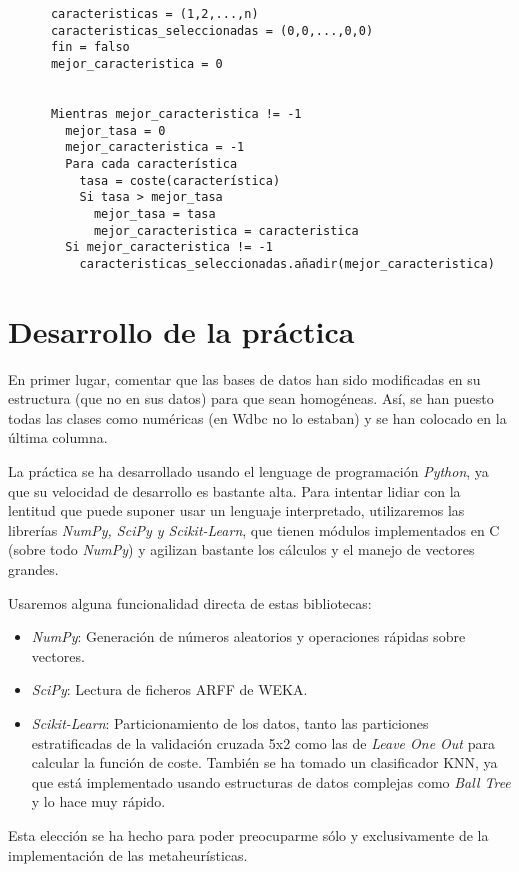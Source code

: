 \documentclass[a4paper, 11pt]{article}
\begin{document}
    \begin{verbatim}
      caracteristicas = (1,2,...,n)
      caracteristicas_seleccionadas = (0,0,...,0,0)
      fin = falso
      mejor_caracteristica = 0


      Mientras mejor_caracteristica != -1
        mejor_tasa = 0
        mejor_caracteristica = -1
        Para cada característica
          tasa = coste(característica)
          Si tasa > mejor_tasa
            mejor_tasa = tasa
            mejor_caracteristica = caracteristica
        Si mejor_caracteristica != -1
          caracteristicas_seleccionadas.añadir(mejor_caracteristica)
    \end{verbatim}
  \section{Desarrollo de la práctica}
    En primer lugar, comentar que las bases de datos han sido modificadas en su estructura (que no en sus datos) para que sean homogéneas. Así, se han puesto todas las clases como numéricas (en Wdbc no lo estaban) y se han colocado en la última columna.

    La práctica se ha desarrollado usando el lenguage de programación \emph{Python}, ya que su velocidad de desarrollo es bastante alta. Para intentar lidiar con la lentitud que puede suponer usar un lenguaje interpretado, utilizaremos las librerías \emph{NumPy, SciPy y Scikit-Learn}, que tienen módulos implementados en C (sobre todo \emph{NumPy}) y agilizan bastante los cálculos y el manejo de vectores grandes.

    Usaremos alguna funcionalidad directa de estas bibliotecas:
    \begin{itemize}
      \item \emph{NumPy}: Generación de números aleatorios y operaciones rápidas sobre vectores.
      \item \emph{SciPy}: Lectura de ficheros ARFF de WEKA.
      \item \emph{Scikit-Learn}: Particionamiento de los datos, tanto las particiones estratificadas de la validación cruzada 5x2 como las de \emph{Leave One Out} para calcular la función de coste. También se ha tomado un clasificador KNN, ya que está implementado usando estructuras de datos complejas como \emph{Ball Tree} y lo hace muy rápido.
    \end{itemize}

    Esta elección se ha hecho para poder preocuparme sólo y exclusivamente de la implementación de las metaheurísticas.
\end{document}
